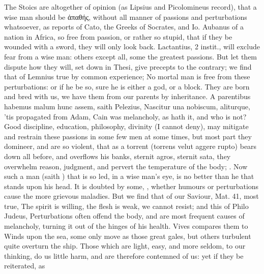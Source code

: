 {{The Stoics are altogether of opinion (as Lipsius and
Picolomineus record), that a wise man should be \textgreek{ἀπαθής}, without
all manner of passions and perturbations whatsoever, as \Seneca
reports of Cato, the  Greeks of Socrates, and Io. Aubanus
of a nation in Africa, so free from passion, or rather so stupid, that
if they be wounded with a sword, they will only look back.
Lactantius, 2 instit., will exclude fear from a wise man: others
except all, some the greatest passions. But let them dispute how they
will, set down in Thesi, give precepts to the contrary; we find that of
Lemnius true by common experience; No mortal man is free from
these perturbations: or if he be so, sure he is either a god, or a
block. They are born and bred with us, we have them from our parents by
inheritance. A parentibus habemus malum hunc assem, saith
Pelezius, Nascitur una nobiscum, aliturque, 'tis propagated from
Adam, Cain was melancholy, as \Austin{} hath it, and who is not?
Good discipline, education, philosophy, divinity (I cannot deny), may
mitigate and restrain these passions in some few men at some times, but
most part they domineer, and are so violent, that as a torrent
(torrens velut aggere rupto) bears down all before, and overflows his
banks, sternit agros, sternit sata}, they overwhelm reason, judgment, and pervert the
temperature of the body; . Now such a man (saith \Austin{}) that is so led, in a wise
man's eye, is no better than he that stands upon his head. It is
doubted by some, ,
whether humours or perturbations cause the more grievous maladies. But
we find that of our Saviour, Mat.  41, most true, The spirit is
willing, the flesh is weak, we cannot resist; and this of Philo
Judeus, Perturbations often offend the body, and are most frequent
causes of melancholy, turning it out of the hinges of his health. Vives
compares them to Winds upon the sea, some only move as those
great gales, but others turbulent quite overturn the ship. Those which
are light, easy, and more seldom, to our thinking, do us little harm,
and are therefore contemned of us: yet if they be reiterated, as
}
